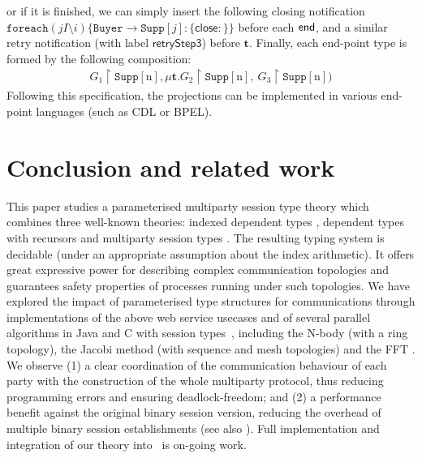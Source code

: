 \documentclass{LMCS}
\newcommand{\kf}[1]{\textup{\textsf{#1}}\xspace}
\newcommand{\ty}{\textbf{t}}
\newcommand{\End}{\kf{end}}
\newcommand{\TO}[2]{#1\to #2}
\newcommand{\GM}[2]{\mu #1.#2}
\newcommand{\ii}{\ensuremath{i}}
\newcommand{\jj}{\ensuremath{j}}
\newcommand{\n}{\ensuremath{\mathrm{n}}}
\newcommand{\II}{\ensuremath{I}}
\newcommand{\proj}[1]{\ensuremath{\upharpoonright #1}}
\newcommand{\MERGE}[1]{\ensuremath{#1}}
\newcommand{\FOREACH}[3]{\ensuremath{\mathtt{foreach}(#1 #2)\{#3\}}}
\begin{document}
or if it is finished, 
we can simply insert the following closing notification
$\FOREACH{\jj}{\II\setminus \ii}
{\TO{\texttt{Buyer}}{\texttt{Supp}[j]}:\{\mathsf{close}:\}}
$
before each $\End$, 
and a similar retry notification (with label $\mathsf{retryStep3}$) before $\ty$.
Finally, each end-point type is formed by the following composition: 
\[ 
\begin{array}{l}
\MERGE{G_1\proj{\texttt{Supp}[\n]}, 
{\GM{\ty}{\MERGE{G_2\proj{\texttt{Supp}[\n]},\ G_3\proj{\texttt{Supp}[\n]}}}}})
\end{array}
\]
Following this specification, the projections can be implemented in various
end-point languages (such as CDL or BPEL).  














\section{Conclusion and related work}
\label{sec:related}
This paper studies a parameterised multiparty session type theory
which combines three well-known theories: indexed dependent types
\cite{DBLP:conf/popl/XiP99}, dependent types with
recursors \cite{DBLP:conf/mfps/Nelson91}
and multiparty session types \cite{BettiniCDLDY08LONG,CHY07}.
The resulting typing system is decidable (under
an appropriate assumption about the index arithmetic).
It offers great expressive power
for describing complex communication topologies
and guarantees safety properties of processes running under
such topologies.
We have explored the impact of
parameterised type structures for
communications
through implementations of the above web service usecases and of several parallel
algorithms in Java and C with session
types~\cite{HU07TYPE-SAFE,HKOYH10}, including
the N-body (with a ring topology),
the Jacobi method
(with sequence and mesh topologies)
and the FFT \cite{NYPHK11,NYH12}.
We observe (1) a clear coordination
of the communication behaviour of each party with the
construction of the whole multiparty protocol, thus reducing
programming errors and ensuring deadlock-freedom; and (2)
a performance benefit against the original binary session version,
reducing the overhead of multiple binary session
establishments (see also \cite{NYPHK11,NYH12}).
Full implementation and integration of our theory
into~\cite{HU07TYPE-SAFE,CorinDFBL09,HKOYH10} is on-going work.
\end{document}
